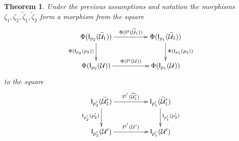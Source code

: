 \documentclass[12pt]{article}
\numberwithin{equation}{section}
\newtheorem{theorem}[proposition]{Theorem}
\newcommand{\wt}{\widetilde}
\newcommand{\U}{\mathcal{U}}
\newcommand{\I}{\mathsf{I}}
\begin{document}
\begin{theorem}
\label{2015.04.10.th3} Under the previous assumptions and notation the
morphisms $\zeta_1,\zeta_2,\wt{\zeta}_1,\wt{\zeta}_2$ form a morphism from the
square
%
$$
\begin{xy}
          \xymatrix@C=4pc{ \Phi(\I_{p_2}(\wt{\U}_1))
            \ar[r]^-{\Phi(\I^g(\wt{\U}_1))} \ar[d]_{\Phi(\I_{p_2}(p_2))} &
            \Phi(\I_{p_1}(\wt{\U}_1))
            \ar[d]^{\Phi(\I_{p_1}(p_2))}\\ \Phi(\I_{p_2}(\U))
            \ar[r]^{\Phi(\I^g(\U))} & \Phi(\I_{p_1}(\U)) }
\end{xy}
$$
%
to the square
%
$$
\begin{xy}
          \xymatrix@C=4pc{
                 \I_{p_2'}(\wt{\U}_1')   \ar[r]^-{\I^{g'}(\wt{\U}_1')} \ar[d]_{\I_{p_2'}(p_2')} & 
                 \I_{p_1'}(\wt{\U}_1') \ar[d]^{\I_{p_1'}(p_2')}\\
		\I_{p_2'}(\U')   \ar[r]^{\I^{g'}(\U')} &
		\I_{p_1'}(\U')
                }
\end{xy}
$$
%
\end{theorem}
%
\end{document}
